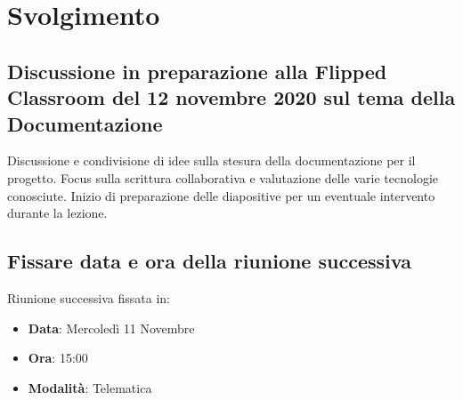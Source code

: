 \documentclass[]{article}
\begin{document}
\newpage

	\section{Svolgimento}
		\subsection{Discussione in preparazione alla Flipped Classroom del 12 novembre 2020 sul tema della Documentazione}
		Discussione e condivisione di idee sulla stesura della documentazione per il progetto. Focus sulla scrittura collaborativa e valutazione delle varie tecnologie conosciute.
		Inizio di preparazione delle diapositive per un eventuale intervento durante la lezione.\\
		
		\subsection{Fissare data e ora della riunione successiva}
		Riunione successiva fissata in:
		\begin{itemize}
			\item \textbf{Data}: Mercoledì 11 Novembre
			\item \textbf{Ora}: 15:00
			\item \textbf{Modalità}: Telematica
		\end{itemize}
\end{document}
